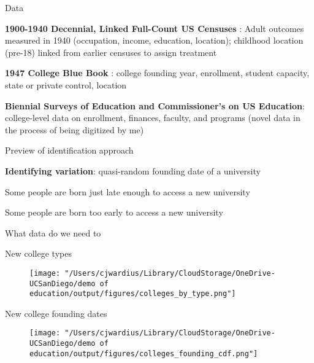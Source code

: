 \documentclass[notes,11pt, aspectratio=169]{beamer}
\newenvironment{wideitemize}{\itemize\addtolength{\itemsep}{10pt}}{\enditemize}
\begin{document}
\begin{frame}{Data}
  \begin{wideitemize}
    \item \textbf{1900-1940 Decennial, Linked Full-Count US Censuses} \cite{rugglesIPUMSUSAVersion2025}: Adult outcomes measured in 1940 (occupation, income, education, location); childhood location (pre-18) linked from earlier censuses to assign treatment
    \item \textbf{1947 College Blue Book} \cite{hurt1947college}: college founding year, enrollment, student capacity, state or private control, location
    \item \textbf{Biennial Surveys of Education and Commissioner's on US Education}: college-level data on enrollment, finances, faculty, and programs (novel data in the process of being digitized by me)  
  \end{wideitemize}
\end{frame}

\begin{frame}{Preview of identification approach}
  \begin{wideitemize}
    \item \textbf{Identifying variation}: quasi-random founding date of a university
    \item Some people are born just late enough to access a new university
    \item Some people are born too early to access a new university
  \end{wideitemize}
\end{frame}

\begin{frame}{What data do we need to}
  
\end{frame}

\begin{frame}{New college types}
  \begin{figure}
        \centering
        \texttt{[image: "/Users/cjwardius/Library/CloudStorage/OneDrive-UCSanDiego/demo of education/output/figures/colleges\_by\_type.png"]}
    \end{figure}
\end{frame}

\begin{frame}{New college founding dates}
  \begin{figure}
        \centering
        \texttt{[image: "/Users/cjwardius/Library/CloudStorage/OneDrive-UCSanDiego/demo of education/output/figures/colleges\_founding\_cdf.png"]}
    \end{figure}
\end{frame}
\end{document}
